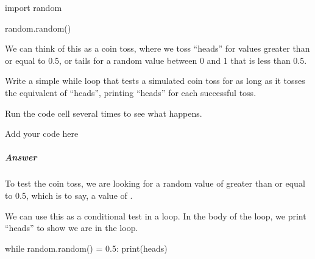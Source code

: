 \documentclass[letterpaper,10pt,english]{sphinxmanual}
\begin{document}
{{
\begin{sphinxVerbatim}[commandchars=\\\{\}]
\llap{\color{nbsphinxin}[ ]:\,\hspace{\fboxrule}\hspace{\fboxsep}}import random

random.random()
\end{sphinxVerbatim}
}

We can think of this as a coin toss, where we toss “heads” for values greater than or equal to 0.5, or tails for a random value between 0 and 1 that is less than 0.5.

Write a simple while loop that tests a simulated coin toss for as long as it tosses the equivalent of “heads”, printing “heads” for each successful toss.

Run the code cell several times to see what happens.

{
\begin{sphinxVerbatim}[commandchars=\\\{\}]
\llap{\color{nbsphinxin}[ ]:\,\hspace{\fboxrule}\hspace{\fboxsep}}\PYGZsh{} Add your code here
\end{sphinxVerbatim}
}


\subparagraph{Answer}
\label{\detokenize{content/02_Robot_Lab/Section_00_01:id4}}

To test the coin toss, we are looking for a random value of greater than or equal to 0.5, which is to say, a value of .

We can use this as a conditional test in a  loop. In the body of the loop, we print “heads” to show we are in the loop.

{
\begin{sphinxVerbatim}[commandchars=\\\{\}]
\llap{\color{nbsphinxin}[ ]:\,\hspace{\fboxrule}\hspace{\fboxsep}}while random.random() \PYGZgt{}= 0.5:
    print(\PYGZdq{}heads\PYGZdq{})
\end{sphinxVerbatim}
}

}
\end{document}
